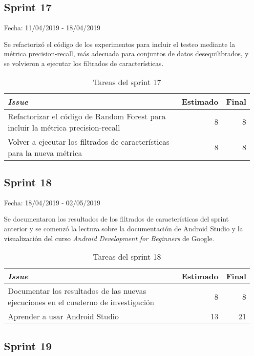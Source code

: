 \subsection{Sprint 17}

Fecha: 11/04/2019 - 18/04/2019

Se refactorizó el código de los experimentos para incluir el testeo mediante la métrica precision-recall, más adecuada para conjuntos de datos desequilibrados, y se volvieron a ejecutar los filtrados de características. 

\begin{table}[H]
	\begin{tabularx}{\textwidth}{Xrr}
		\toprule \textbf{\textit{Issue}} & \textbf{Estimado} & \textbf{Final}\\
		\toprule
		Refactorizar el código de Random Forest para incluir la métrica precision-recall & 8 & 8 \\
		Volver a ejecutar los filtrados de características para la nueva métrica & 8 & 8 \\
		\bottomrule
	\end{tabularx}
	\caption{Tareas del sprint 17}
\end{table}

\subsection{Sprint 18}

Fecha: 18/04/2019 - 02/05/2019

Se documentaron los resultados de los filtrados de características del sprint anterior y se comenzó la lectura sobre la documentación de Android Studio y la visualización del curso \textit{Android Development for Beginners} de Google.

\begin{table}[H]
	\begin{tabularx}{\textwidth}{Xrr}
		\toprule \textbf{\textit{Issue}} & \textbf{Estimado} & \textbf{Final}\\
		\toprule
		Documentar los resultados de las nuevas ejecuciones en el cuaderno de investigación & 8 & 8 \\
		Aprender a usar Android Studio & 13 & 21 \\
		\bottomrule
	\end{tabularx}
	\caption{Tareas del sprint 18}
\end{table}

\subsection{Sprint 19}

